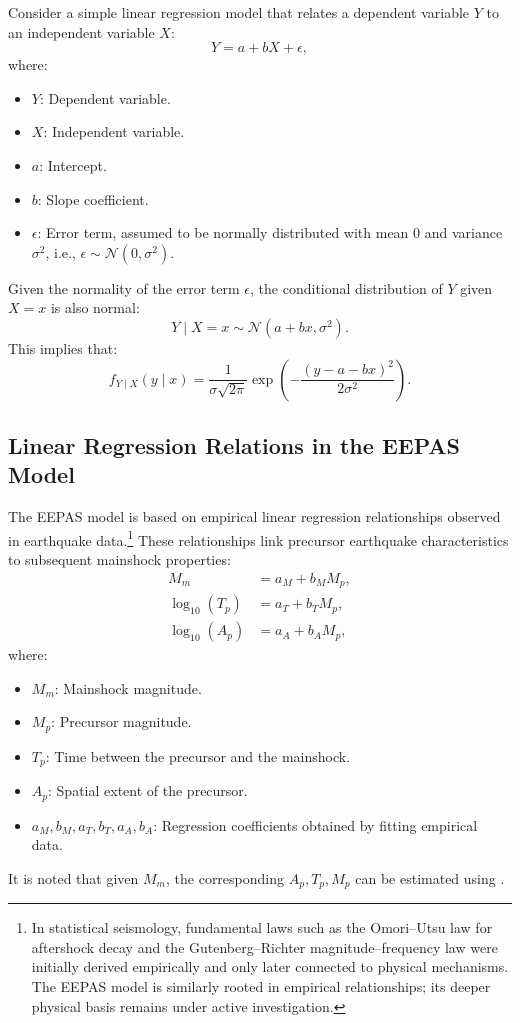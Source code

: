 \documentclass[extra,mreferee]{gji}
\theoremstyle{lemma}
\begin{document}
Consider a simple linear regression model that relates a dependent variable \( Y \) to an independent variable \( X \):
\begin{equation*}
Y = a + bX + \epsilon,
\end{equation*}
where:
\begin{itemize}
    \item \( Y \): Dependent variable.
    \item \( X \): Independent variable.
    \item \( a \): Intercept.
    \item \( b \): Slope coefficient.
    \item \( \epsilon \): Error term, assumed to be normally distributed with mean 0 and variance \( \sigma^2 \), i.e., \( \epsilon \sim \mathcal{N}(0, \sigma^2) \).
\end{itemize}
Given the normality of the error term \( \epsilon \), the conditional distribution of \( Y \) given \( X = x \) is also normal:
\begin{equation*}
Y \mid X = x \sim \mathcal{N}(a + b x, \sigma^2).
\end{equation*}
This implies that:
\begin{equation*}
f_{Y\mid X}(y \mid x) = \frac{1}{\sigma \sqrt{2\pi}} \exp\!\left( -\frac{(y - a - b x)^2}{2\sigma^2} \right).
\end{equation*}

\subsection{Linear Regression Relations in the EEPAS Model}

The EEPAS model is based on empirical linear regression relationships observed in earthquake data.\footnote{In statistical seismology, fundamental laws such as the Omori--Utsu law for aftershock decay and the Gutenberg--Richter magnitude--frequency law were initially derived empirically and only later connected to physical mechanisms. The EEPAS model is similarly rooted in empirical relationships; its deeper physical basis remains under active investigation.} 
These relationships link precursor earthquake characteristics to subsequent mainshock properties:
\begin{align}
M_m &= a_M + b_M M_p, \label{mag_r}\\
\log_{10}(T_p) &= a_T + b_T M_p, \label{time_r}\\
\log_{10}(A_p) &= a_A + b_A M_p, \label{spatial_r}
\end{align}
where:
\begin{itemize}
    \item \( M_m \): Mainshock magnitude.
    \item \( M_p \): Precursor magnitude.
    \item \( T_p \): Time between the precursor and the mainshock.
    \item \( A_p \): Spatial extent of the precursor.
    \item \( a_M, b_M, a_T, b_T, a_A, b_A \): Regression coefficients obtained by fitting empirical data.
\end{itemize}
It is noted that given $M_m$, the corresponding $A_p, T_p, M_p$ can be estimated using \cite{psi}.
\end{document}
